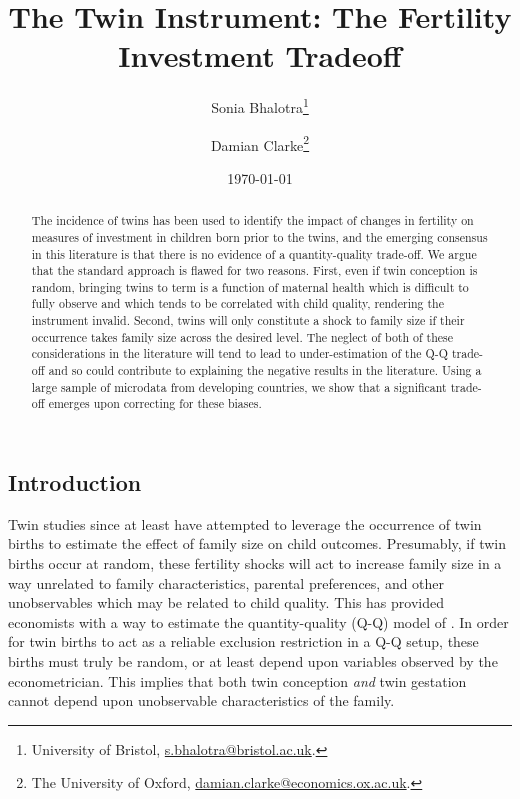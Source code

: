 \documentclass{article}[12pt,subeqn]
\title{The Twin Instrument: The Fertility Investment Tradeoff}
\author{Sonia Bhalotra\thanks{University of Bristol, \href{mailto:s.bhalotra@bristol.ac.uk}{s.bhalotra@bristol.ac.uk}.} \and Damian Clarke\thanks{The University of Oxford, \href{mailto:damian.clarke@economics.ox.ac.uk}{damian.clarke@economics.ox.ac.uk}.}}
\date{\today}
\begin{document}
\begin{spacing}{1.25}



\maketitle
\end{spacing}
\begin{spacing}{1.5}	

\begin{abstract}
The incidence of twins has been used to identify the impact of changes in fertility on measures of investment in children born prior to the twins, and the emerging consensus in this literature is that there is no evidence of a quantity-quality trade-off. We argue that the standard approach is flawed for two reasons. First, even if twin conception is random, bringing twins to term is a function of maternal health which is difficult to fully observe and which tends to be correlated with child quality, rendering the instrument invalid. Second, twins will only constitute a shock to family size if their occurrence takes family size across the desired level. The neglect of both of these considerations in the literature will tend to lead to under-estimation of the Q-Q trade-off and so could contribute to explaining the negative results in the literature. Using a large sample of microdata from developing countries, we show that a significant trade-off emerges upon correcting for these biases.
\end{abstract}
\newpage

\section{Introduction}
\label{scn:intro}
Twin studies since at least \citet{RosenzweigWolpin1980} have attempted to leverage the occurrence of twin births to estimate the effect of family size on
child outcomes.  Presumably, if twin births occur at random, these fertility shocks will act to increase family size in a way unrelated to family characteristics,
parental preferences, and other unobservables which may be related to child quality.  This has provided economists with a way to estimate the quantity-quality
(Q-Q) model of \citet{BeckerLewis1973}.  In order for twin births to act as a reliable exclusion restriction in a Q-Q setup, these births must truly be random, 
or at least depend upon variables observed by the econometrician.  This implies that both twin conception \emph{and} twin gestation cannot depend upon unobservable 
characteristics of the family.


\end{spacing}
\end{document}

